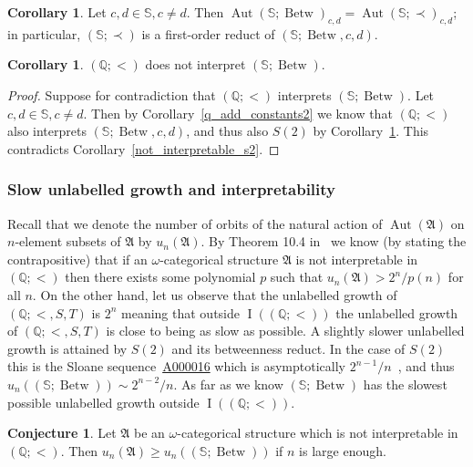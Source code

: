 \documentclass{amsart}
\theoremstyle{definition}
\newtheorem{corollary}[theorem]{Corollary}
\newtheorem{conjecture}[theorem]{Conjecture}
\theoremstyle{remark}
\numberwithin{equation}{section}
\DeclareMathOperator{\I}{\operatorname{I}}
\newcommand{\aut}{\operatorname{Aut}}
\newcommand{\order}{(\mathbb{Q};<)}
\newcommand{\betw}{\operatorname{Betw}}
\newcommand{\fa}{\mathfrak{A}}
\newcommand{\cc}{\mathbb{S}}
\begin{document}
\begin{corollary}\label{local_easy}
	Let $c,d\in \cc, c\neq d$. Then $\aut(\cc;\betw)_{c,d}=\aut(\cc;\prec)_{c,d}$; in particular, $(\cc;\prec)$ is a first-order reduct of $(\cc;\betw,c,d)$.
\end{corollary}

\begin{corollary}\label{not_interpretable_circular}
	$(\mathbb{Q};<)$ does not interpret $(\cc;\betw)$.
\end{corollary}

\begin{proof}
	Suppose for contradiction that $(\mathbb{Q};<)$ interprets $(\cc;\betw)$. Let $c,d\in \cc, c\neq d$. Then by Corollary~\ref{q_add_constants2} we know that $(\mathbb{Q};<)$ also interprets $(\cc;\betw,c,d)$, and thus also $S(2)$ by Corollary~\ref{local_easy}. This contradicts Corollary~\ref{not_interpretable_s2}.
\end{proof}

\subsubsection{Slow unlabelled growth and interpretability}\label{sect:slow}
Recall that we denote the number of orbits of the natural action of $\aut(\fa)$ on $n$-element subsets of $\fa$ by $u_n(\fa)$.
	By Theorem 10.4 in~\cite{bodor2025structures} we know (by stating the contrapositive) that if an $\omega$-categorical structure $\fa$ is not interpretable in $\order$ then there exists some polynomial $p$ such that $u_n(\fa)>2^n/p(n)$ for all $n$. On the other hand, let us observe that the unlabelled growth of $(\mathbb{Q};<,S,T)$ is $2^n$ meaning that outside $\I(\order)$ the unlabelled growth of $(\mathbb{Q};<,S,T)$ is close to being as slow as possible. A slightly slower unlabelled growth is attained by $S(2)$ and its betweenness reduct. In the case of $S(2)$ this is the Sloane sequence~\href{https://oeis.org/A000016}{A000016} which is asymptotically $2^{n-1}/n$~\cite{brouwer1980enumeration}, and thus $u_n((\cc;\betw))\sim 2^{n-2}/n$. As far as we know $(\cc;\betw)$ has the slowest possible unlabelled growth outside $\I(\order)$.%
	
\begin{conjecture}\label{conj:slow1}
	Let $\fa$ be an $\omega$-categorical structure which is not interpretable in $\order$. Then $u_n(\fa)\geq u_n((\cc;\betw))$ if $n$ is large enough.
\end{conjecture}
\end{document}

